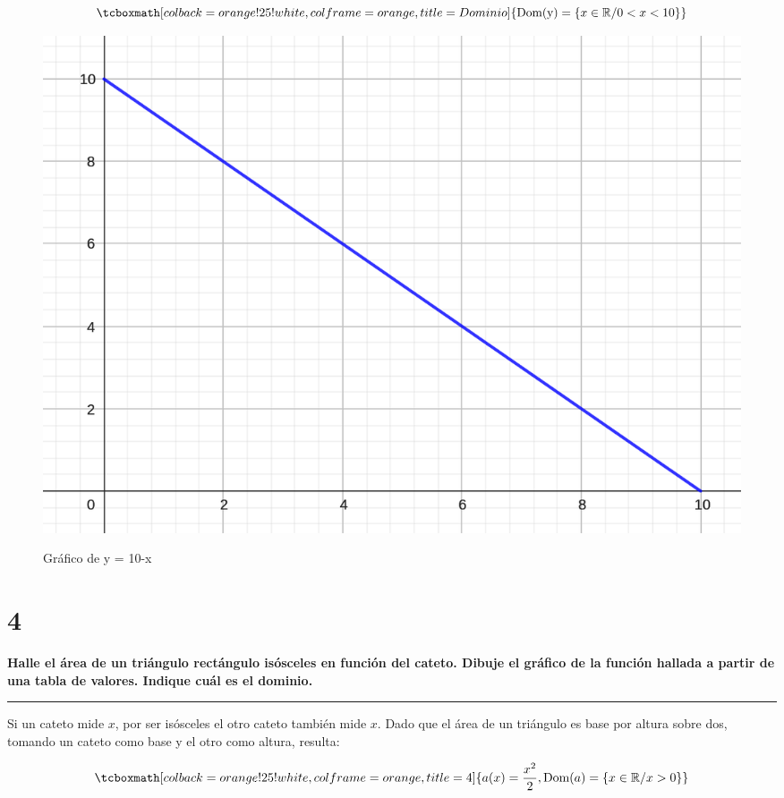 \documentclass{article}
\newcommand{\hresult}[2]{\tcboxmath[colback=orange!25!white,colframe=orange, title=#1] {#2} }
\begin{document}
\begin{equation}
\hresult{Dominio}{ \mathop{\text{Dom(y)}} = \{ x \in \mathbb{R} / 0 < x < 10 \} }
\end{equation}

\newpage

\begin{figure}[ht]
\caption{Gráfico de y = 10-x}
\includegraphics[scale=0.8]{../img/guide_01/ex_03.png} 
\centering
\label{fig:3}
\end{figure}

\section*{4}
\label{sec:4}

\textbf{Halle el área de un triángulo rectángulo isósceles en función del cateto. Dibuje el gráfico de la función hallada a partir de una tabla de valores. Indique cuál es el dominio.}

\vspace{1em}
\hrule
\vspace{1em}

Si un cateto mide $x$, por ser isósceles el otro cateto también mide $x$. Dado que el área de un triángulo es base por altura sobre dos, tomando un cateto como base y el otro como altura, resulta:

\begin{equation}
\hresult{4}{ a(x) = \frac{x^2}{2}, \mathop{\text{Dom}}(a) = \{ x \in \mathbb{R} / x > 0 \} }
\end{equation}

\newpage
\end{document}

